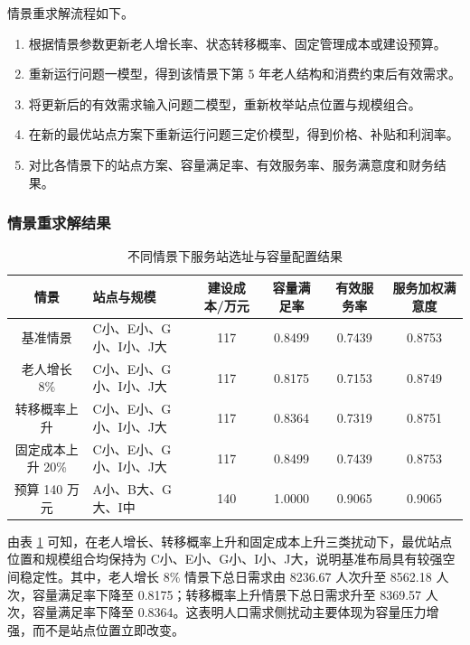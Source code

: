 情景重求解流程如下。

\begin{enumerate}
    \item[Step 1] 根据情景参数更新老人增长率、状态转移概率、固定管理成本或建设预算。
    \item[Step 2] 重新运行问题一模型，得到该情景下第 5 年老人结构和消费约束后有效需求。
    \item[Step 3] 将更新后的有效需求输入问题二模型，重新枚举站点位置与规模组合。
    \item[Step 4] 在新的最优站点方案下重新运行问题三定价模型，得到价格、补贴和利润率。
    \item[Step 5] 对比各情景下的站点方案、容量满足率、有效服务率、服务满意度和财务结果。
\end{enumerate}

\subsubsection{情景重求解结果}

\begin{table}[H]
\centering
\caption{不同情景下服务站选址与容量配置结果}
\label{tab:p4_summary}
\begin{tabular}{c p{} c c c c}
\toprule
情景 & 站点与规模 & 建设成本/万元 & 容量满足率 & 有效服务率 & 服务加权满意度 \\
\midrule
基准情景 & C小、E小、G小、I小、J大 & 117 & 0.8499 & 0.7439 & 0.8753 \\
老人增长 8\% & C小、E小、G小、I小、J大 & 117 & 0.8175 & 0.7153 & 0.8749 \\
转移概率上升 & C小、E小、G小、I小、J大 & 117 & 0.8364 & 0.7319 & 0.8751 \\
固定成本上升 20\% & C小、E小、G小、I小、J大 & 117 & 0.8499 & 0.7439 & 0.8753 \\
预算 140 万元 & A小、B大、G大、I中 & 140 & 1.0000 & 0.9065 & 0.9065 \\
\bottomrule
\end{tabular}
\end{table}

由表 \ref{tab:p4_summary} 可知，在老人增长、转移概率上升和固定成本上升三类扰动下，最优站点位置和规模组合均保持为 C小、E小、G小、I小、J大，说明基准布局具有较强空间稳定性。其中，老人增长 8\% 情景下总日需求由 8236.67 人次升至 8562.18 人次，容量满足率下降至 0.8175；转移概率上升情景下总日需求升至 8369.57 人次，容量满足率下降至 0.8364。这表明人口需求侧扰动主要体现为容量压力增强，而不是站点位置立即改变。

